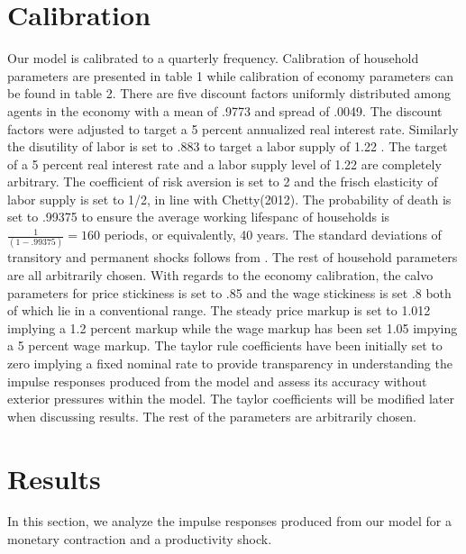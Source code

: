 \documentclass[titlepage]{\econtex}\providecommand{\texname}{FBS-NK}
\providecommand{\TableDir}{Tables}
\begin{document}
\hypertarget{Calibration}{}
\section{Calibration}



Our model is calibrated to a quarterly frequency. Calibration of household parameters are presented in table 1 while calibration of economy parameters can be found in table 2. There are five discount factors uniformly distributed among agents in the economy with a mean of .9773 and spread of .0049. The discount factors were adjusted to target a 5 percent annualized real interest rate. Similarly the disutility of labor is set to .883 to target a labor supply of 1.22 . The target of a 5 percent real interest rate and a labor supply level of 1.22 are completely arbitrary.  The coefficient of risk aversion is set to 2 and the frisch elasticity of labor supply is set to 1/2, in line with Chetty(2012).  The probability of death is set to .99375 to ensure the average working lifespanc of households is $ \frac{1}{(1-.99375)} = 160$ periods, or equivalently, 40 years.  The standard deviations of transitory and permanent shocks follows from \cite{carroll2017distribution}. The rest of household parameters are all arbitrarily chosen. With regards to the economy calibration, the calvo parameters for price stickiness is set to .85 and the wage stickiness is set .8 both of which lie in a conventional range. The steady price markup is set to 1.012 implying a 1.2 percent markup while the wage markup has been set 1.05 impying a 5 percent wage markup. The taylor rule coefficients have been initially set to zero implying a fixed nominal rate to provide transparency in understanding the impulse responses produced from the model and assess its accuracy without exterior pressures within the model. The taylor coefficients will be modified later when discussing results. The rest of the parameters are arbitrarily chosen. \\






\hypertarget{Results}{}
\section{Results}

In this section, we analyze the impulse responses produced from our model for a monetary contraction and a productivity shock.
\end{document}
